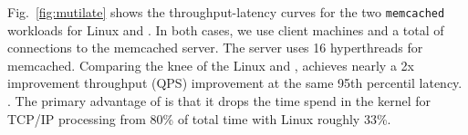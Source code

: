 
 Fig.~\ref{fig:mutilate} shows the
throughput-latency curves for the two \texttt{memcached} workloads for
Linux and \ix. In both cases, we use  client machines and
a total of  connections to the memcached server. The
server uses 16 hyperthreads for memcached. Comparing the knee of the
Linux and \ix, \ix achieves nearly a 2x improvement throughput (QPS)
improvement at the same 95th percentil latency. . The primary
advantage of \ix is that it drops the time spend in the kernel for
TCP/IP processing from 80\% of total time with Linux roughly
 33\%. 


%

